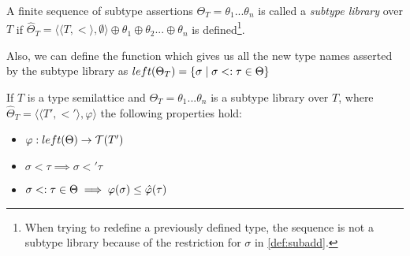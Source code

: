 \documentclass[main.tex]{subfiles}
\begin{document}
\begin{defn}
    A finite sequence of subtype assertions
    $\Theta_T = \theta_1 ... \theta_n$ is called a \emph{subtype library} over $T$
    if $\hat{\Theta}_T = \langle \langle T, \less \rangle, \emptyset \rangle \oplus \theta_1 \oplus \theta_2 ... \oplus \theta_n$
    is defined\footnote{
        When trying to redefine a previously defined type, the sequence is not
        a subtype library because of the restriction for $\sigma$
        in \cref{def:subadd}.
    }.

    Also, we can define the function which gives us all the new type names
    asserted by the subtype library as
    $left(\Theta_T) = \{ \sigma \mid \sigma <: \tau \in \Theta \}$
\end{defn}

\begin{prop}
    If $T$ is a type semilattice and
    $\Theta_T = \theta_1 ... \theta_n$ is a subtype library over $T$, where
    $\hat{\Theta}_T = \langle \langle T', \less' \rangle, \varphi \rangle$
    the following properties hold:
    \begin{itemize}
        \item $\varphi : left(\Theta) \rightarrow \mathcal{T}( T' )$
        \item $\sigma \less \tau \implies \sigma \less' \tau$
        \item $\sigma <: \tau \in \Theta \implies \varphi(\sigma) \leq \hat{\varphi}(\tau)$
    \end{itemize}
\end{prop}
\end{document}
